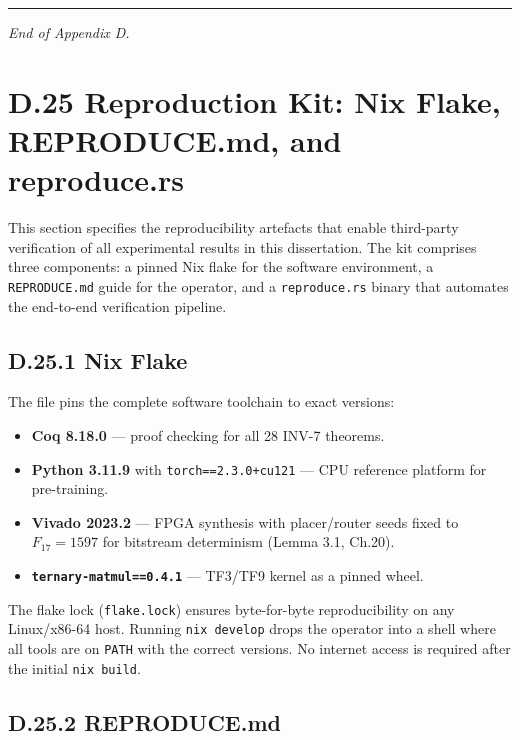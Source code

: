 \medskip
\noindent\rule{\linewidth}{0.4pt}

\noindent\textit{End of Appendix D.}


\section*{D.25  Reproduction Kit: Nix Flake, REPRODUCE.md, and reproduce.rs}

This section specifies the reproducibility artefacts that enable third-party verification of all experimental results in this dissertation. The kit comprises three components: a pinned Nix flake for the software environment, a \texttt{REPRODUCE.md} guide for the operator, and a \texttt{reproduce.rs} binary that automates the end-to-end verification pipeline.

\subsection*{D.25.1  Nix Flake}

The file  pins the complete software toolchain to exact versions:

\begin{itemize}
\item \textbf{Coq 8.18.0} --- proof checking for all 28 INV-7 theorems.
\item \textbf{Python 3.11.9} with \texttt{torch==2.3.0+cu121} --- CPU reference platform for pre-training.
\item \textbf{Vivado 2023.2} --- FPGA synthesis with placer/router seeds fixed to \(F_{17} = 1597\) for bitstream determinism (Lemma 3.1, Ch.20).
\item \textbf{\texttt{ternary-matmul==0.4.1}} --- TF3/TF9 kernel as a pinned wheel.
\end{itemize}

The flake lock (\texttt{flake.lock}) ensures byte-for-byte reproducibility on any Linux/x86-64 host. Running \texttt{nix develop} drops the operator into a shell where all tools are on \texttt{PATH} with the correct versions. No internet access is required after the initial \texttt{nix build}.

\subsection*{D.25.2  REPRODUCE.md}

